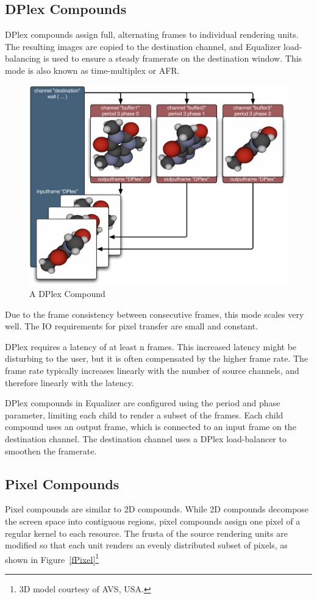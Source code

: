 \documentclass[10pt,a4]{scrartcl}
\newcommand{\fig}[1]{Figure~\ref{#1}}
\begin{document}
\subsection{\label{sDPlex}DPlex Compounds}

DPlex compounds assign full, alternating frames to individual rendering
units. The resulting images are copied to the destination channel, and
Equalizer load-balancing is used to ensure a steady framerate on the
destination window. This mode is also known as time-multiplex or AFR.

\begin{figure}
  \includegraphics[width=.618\textwidth]{images/DPlex.pdf}
  {\caption{ A DPlex Compound}}
\end{figure}

Due to the frame consistency between consecutive frames, this mode scales
very well. The IO requirements for pixel transfer are small and
constant.

DPlex requires a latency of at least n frames. This increased latency
might be disturbing to the user, but it is often compensated by the
higher frame rate. The frame rate typically increases linearly with the
number of source channels, and therefore linearly with the latency.

DPlex compounds in Equalizer are configured using the \textsf{period}
and \textsf{phase} parameter, limiting each child to render a subset of
the frames. Each child compound uses an output frame, which is connected
to an input frame on the destination channel. The destination channel
uses a DPlex load-balancer to smoothen the framerate.


\subsection{Pixel Compounds}

Pixel compounds are similar to 2D compounds. While 2D compounds decompose the
screen space into contiguous regions, pixel compounds assign one pixel of a
regular kernel to each resource. The frusta of the source rendering units are
modified so that each unit renders an evenly distributed subset of pixels, as
shown in \fig{fPixel}\footnote{3D model courtesy of AVS, USA.}
\end{document}

